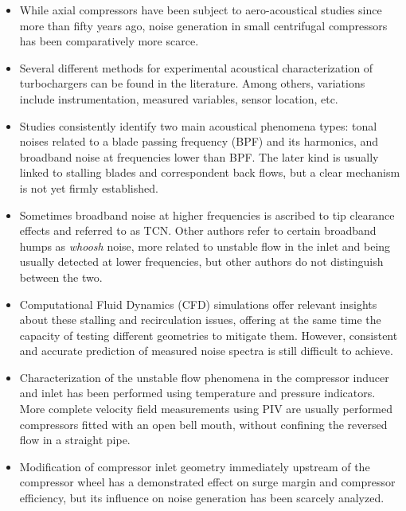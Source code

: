 \begin{itemize}
	\item While axial compressors have been subject to aero-acoustical studies since more than fifty years ago, noise generation in small centrifugal compressors has been comparatively more scarce.

	\item Several different methods for experimental acoustical characterization of turbochargers can be found in the literature. Among others, variations include instrumentation, measured variables, sensor location, etc.

	\item Studies consistently identify two main acoustical phenomena types: tonal noises related to a blade passing frequency (BPF) and its harmonics, and broadband noise at frequencies lower than BPF. The later kind is usually linked to stalling blades and correspondent back flows, but a clear mechanism is not yet firmly established. 

  \item Sometimes broadband noise at higher frequencies is ascribed to tip clearance effects and referred to as TCN. Other authors refer to certain broadband humps as \emph{whoosh} noise, more related to unstable flow in the inlet and being usually detected at lower frequencies, but other authors do not distinguish between the two.

	\item Computational Fluid Dynamics (CFD) simulations offer relevant insights about these stalling and recirculation issues, offering at the same time the capacity of testing different geometries to mitigate them. However, consistent and accurate prediction of measured noise spectra is still difficult to achieve.

  \item Characterization of the unstable flow phenomena in the compressor inducer and inlet has been performed using temperature and pressure indicators. More complete velocity field measurements using PIV are usually performed compressors fitted with an open bell mouth, without confining the reversed flow in a straight pipe. 

	\item Modification of compressor inlet geometry immediately upstream of the compressor wheel has a demonstrated effect on surge margin and compressor efficiency, but its influence on noise generation has been scarcely analyzed.

	\end{itemize}